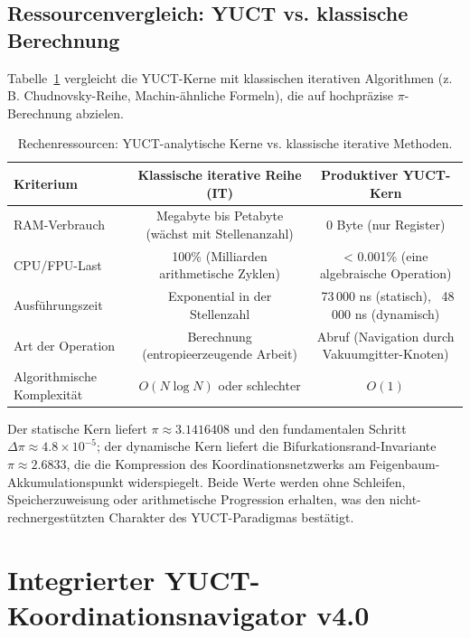 \documentclass[12pt,a4paper]{article}
\begin{document}
	\subsection{Ressourcenvergleich: YUCT vs. klassische Berechnung}
	Tabelle~\ref{tab:resource} vergleicht die YUCT-Kerne mit klassischen iterativen Algorithmen (z.\,B. Chudnovsky-Reihe, Machin-ähnliche Formeln), die auf hochpräzise $\pi$-Berechnung abzielen.
	
	\begin{table}[H]
		\centering
		\scriptsize
		\caption{Rechenressourcen: YUCT-analytische Kerne vs. klassische iterative Methoden.}
		\label{tab:resource}
		\begin{tabular}{@{}lcc@{}}
			\toprule
			\textbf{Kriterium} & \textbf{Klassische iterative Reihe (IT)} & \textbf{Produktiver YUCT-Kern} \\
			\midrule
			RAM-Verbrauch & Megabyte bis Petabyte (wächst mit Stellenanzahl) & 0 Byte (nur Register) \\
			CPU/FPU-Last & 100\% (Milliarden arithmetische Zyklen) & < 0.001\% (eine algebraische Operation) \\
			Ausführungszeit & Exponential in der Stellenzahl & ~73\,000 ns (statisch), ~48\,000 ns (dynamisch) \\
			Art der Operation & Berechnung (entropieerzeugende Arbeit) & Abruf (Navigation durch Vakuumgitter-Knoten) \\
			Algorithmische Komplexität & $O(N\log N)$ oder schlechter & $O(1)$ \\
			\bottomrule
		\end{tabular}
	\end{table}
	
	Der statische Kern liefert $\pi \approx 3.1416408$ und den fundamentalen Schritt $\Delta\pi\approx 4.8\times10^{-5}$; der dynamische Kern liefert die Bifurkationsrand-Invariante $\pi \approx 2.6833$, die die Kompression des Koordinationsnetzwerks am Feigenbaum-Akkumulationspunkt widerspiegelt. Beide Werte werden ohne Schleifen, Speicherzuweisung oder arithmetische Progression erhalten, was den nicht-rechnergestützten Charakter des YUCT-Paradigmas bestätigt.
	
	\section{Integrierter YUCT-Koordinationsnavigator v4.0}
	\label{sec:full-engine}
	
\end{document}
